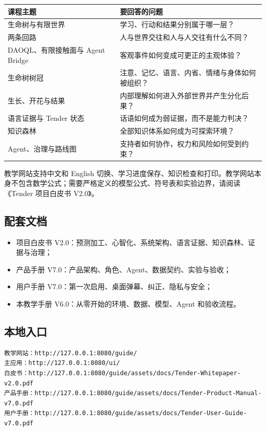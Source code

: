 \documentclass[UTF8,a4paper,11pt]{ctexart}
\begin{document}
\begin{center}
\begin{longtable}{@{}p{3.6cm}p{8.0cm}@{}}
\toprule
\textbf{课程主题} & \textbf{要回答的问题} \\
\midrule
生命树与有限世界 & 学习、行动和结果分别属于哪一层？ \\
两条回路 & 人与世界交往和人与人交往有什么不同？ \\
DAOQL、有限接触面与 Agent Bridge & 客观事件如何变成可更正的主观体验？ \\
生命树树冠 & 注意、记忆、语言、内省、情绪与身体如何被组织？ \\
生长、开花与结果 & 内部理解如何进入外部世界并产生分化后果？ \\
语言证据与 Tender 状态 & 话语如何成为弱证据，而不是能力判决？ \\
知识森林 & 全部知识体系如何成为可探索环境？ \\
Agent、治理与路线图 & 支持者如何协作，权力和风险如何受到约束？ \\
\bottomrule
\end{longtable}
\end{center}

教学网站支持中文和 English 切换、学习进度保存、知识检查和打印。教学网站本身不包含数学公式；需要严格定义的模型公式、符号表和实验边界，请阅读《Tender 项目白皮书 V2.0》。

\subsection{配套文档}

\begin{itemize}
\item 项目白皮书 V2.0：预测加工、心智化、系统架构、语言证据、知识森林、证据与治理；
\item 产品手册 V7.0：产品架构、角色、Agent、数据契约、实验与验收；
\item 用户手册 V7.0：第一次启用、桌面弹幕、纠正、隐私与安全；
\item 本教学手册 V6.0：从零开始的环境、数据、模型、Agent 和验收流程。
\end{itemize}

\subsection{本地入口}

\begin{verbatim}
教学网站：http://127.0.0.1:8080/guide/
主应用：http://127.0.0.1:8080/ui/
白皮书：http://127.0.0.1:8080/guide/assets/docs/Tender-Whitepaper-v2.0.pdf
产品手册：http://127.0.0.1:8080/guide/assets/docs/Tender-Product-Manual-v7.0.pdf
用户手册：http://127.0.0.1:8080/guide/assets/docs/Tender-User-Guide-v7.0.pdf
\end{verbatim}
\end{document}

